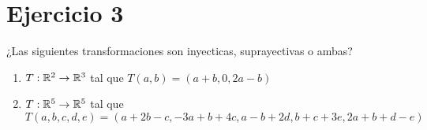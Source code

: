 \section*{Ejercicio 3}

¿Las siguientes transformaciones son inyecticas, suprayectivas o ambas?

\begin{enumerate}
    \item $T: \mathbb{R}^{2} \rightarrow \mathbb{R}^{3}$ tal que $T(a,b) = (a + b, 0, 2a - b)$
    \item $T: \mathbb{R}^{5} \rightarrow \mathbb{R}^{5}$ tal que $T(a,b,c,d,e)  = (a + 2b -c, -3a + b + 4c, a - b + 2d, b + c +3e, 2a +b+d-e)$
\end{enumerate}